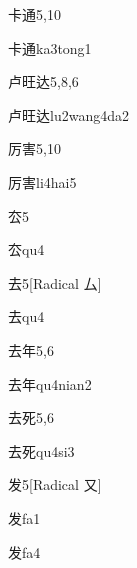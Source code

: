 \begin{entry}{卡通}{5,10}
  \begin{phonetics}{卡通}{ka3tong1}
  \end{phonetics}
\end{entry}

\begin{entry}{卢旺达}{5,8,6}
  \begin{phonetics}{卢旺达}{lu2wang4da2}
  \end{phonetics}
\end{entry}

\begin{entry}{厉害}{5,10}
  \begin{phonetics}{厉害}{li4hai5}
  \end{phonetics}
\end{entry}

\begin{entry}{厺}{5}
  \begin{phonetics}{厺}{qu4}
  \end{phonetics}
\end{entry}

\begin{entry}{去}{5}[Radical 厶]
  \begin{phonetics}{去}{qu4}
  \end{phonetics}
\end{entry}

\begin{entry}{去年}{5,6}
  \begin{phonetics}{去年}{qu4nian2}
  \end{phonetics}
\end{entry}

\begin{entry}{去死}{5,6}
  \begin{phonetics}{去死}{qu4si3}
  \end{phonetics}
\end{entry}

\begin{entry}{发}{5}[Radical ⼜]
  \begin{phonetics}{发}{fa1}
  \end{phonetics}
  \begin{phonetics}{发}{fa4}
  \end{phonetics}
\end{entry}

